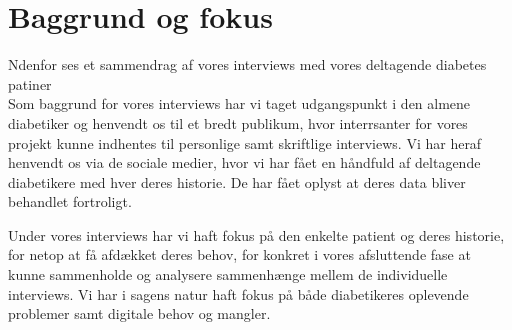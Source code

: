 \section{Baggrund og fokus}
Ndenfor ses et sammendrag af vores interviews med vores deltagende diabetes patiner\\

Som baggrund for vores interviews har vi taget udgangspunkt i den almene diabetiker og henvendt os til et bredt publikum, hvor interrsanter for vores projekt kunne indhentes til personlige samt skriftlige interviews. Vi har heraf henvendt os via de sociale medier, hvor vi har fået en håndfuld af deltagende diabetikere med hver deres historie. De har fået oplyst at deres data bliver behandlet fortroligt.

Under vores interviews har vi haft fokus på den enkelte patient og deres historie, for netop at få afdækket deres behov, for konkret i vores afsluttende fase at kunne sammenholde og analysere sammenhænge mellem de individuelle interviews. Vi har i sagens natur haft fokus på både diabetikeres oplevende problemer samt digitale behov og mangler.

